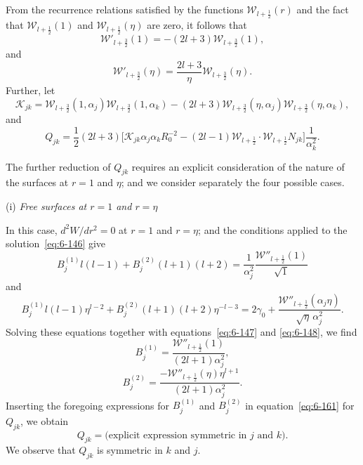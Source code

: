 From the recurrence relations satisfied by the functions $\mathscr{W}_{l+\frac{1}{2}}(r)$ and
the fact that $\mathscr{W}_{l+\frac{1}{2}}(1)$ and $\mathscr{W}_{l+\frac{1}{2}}(\eta)$ are zero, it follows that
\begin{equation}\label{eq:6-158}
\mathscr{W}'_{l+\frac{3}{2}}(1) = -(2l+3)\mathscr{W}_{l+\frac{3}{2}}(1),
\end{equation}
and
\begin{equation}\label{eq:6-159}
\mathscr{W}'_{l+\frac{3}{2}}(\eta) = \frac{2l+3}{\eta}\mathscr{W}_{l+\frac{3}{2}}(\eta).
\end{equation}
Further, let
\begin{equation}\label{eq:6-160}
\mathscr{K}_{jk} = \mathscr{W}_{l+\frac{3}{2}}(1,\alpha_j)\mathscr{W}_{l+\frac{3}{2}}(1,\alpha_k) - (2l+3)\mathscr{W}_{l+\frac{3}{2}}(\eta,\alpha_j)\mathscr{W}_{l+\frac{3}{2}}(\eta,\alpha_k),
\end{equation}
and
\begin{equation}\label{eq:6-161}
Q_{jk} = \frac{1}{2}(2l+3)\bigl[\mathscr{K}_{jk}\alpha_j\alpha_k R_0^{-2} - (2l-1)\mathscr{W}_{l+\frac{1}{2}}\cdot\mathscr{W}_{l+\frac{1}{2}} N_{jk}\bigr]\frac{1}{\alpha_k^2}.
\end{equation}

The further reduction of $Q_{jk}$ requires an explicit consideration of the
nature of the surfaces at $r = 1$ and $\eta$; and we consider separately the
four possible cases.

\medskip
\noindent (i) \emph{Free surfaces at $r = 1$ and $r = \eta$}

In this case, $d^2 W/dr^2 = 0$ at $r = 1$ and $r = \eta$; and the conditions
applied to the solution~\eqref{eq:6-146} give
\begin{equation}\label{eq:6-162}
B_j^{(1)}l(l-1) + B_j^{(2)}(l+1)(l+2) = \frac{1}{\alpha_j^2}\frac{\mathscr{W}''_{l+\frac{1}{2}}(1)}{\sqrt{1}}
\end{equation}
and
\begin{equation}\label{eq:6-163}
B_j^{(1)}l(l-1)\eta^{l-2} + B_j^{(2)}(l+1)(l+2)\eta^{-l-3} = 2\gamma_0 + \frac{\mathscr{W}''_{l+\frac{1}{2}}(\alpha_j\eta)}{\sqrt{\eta}\,\alpha_j^2}.
\end{equation}
Solving these equations together with equations~\eqref{eq:6-147} and \eqref{eq:6-148}, we find
\begin{equation}\label{eq:6-164}
B_j^{(1)} = \frac{\mathscr{W}''_{l+\frac{1}{2}}(1)}{(2l+1)\alpha_j^2},
\end{equation}
\begin{equation}\label{eq:6-165}
B_j^{(2)} = \frac{-\mathscr{W}''_{l+\frac{1}{2}}(\eta)\eta^{l+1}}{(2l+1)\alpha_j^2}.
\end{equation}
Inserting the foregoing expressions for $B_j^{(1)}$ and $B_j^{(2)}$ in equation~\eqref{eq:6-161} for
$Q_{jk}$, we obtain
\begin{equation}\label{eq:6-166}
Q_{jk} = \text{(explicit expression symmetric in } j \text{ and } k\text{)}.
\end{equation}
We observe that $Q_{jk}$ is symmetric in $k$ and $j$.

